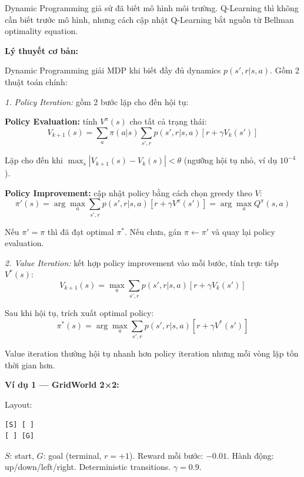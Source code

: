 \documentclass[12pt,a4paper]{article}
\begin{document}
Dynamic Programming giả sử đã biết mô hình môi trường. Q-Learning thì không cần biết trước mô hình, nhưng cách cập nhật Q-Learning bắt nguồn từ Bellman optimality equation.

\textbf{Lý thuyết cơ bản:}

Dynamic Programming giải MDP khi biết đầy đủ dynamics $p(s',r|s,a)$. Gồm 2 thuật toán chính:

\textit{1. Policy Iteration:} gồm 2 bước lặp cho đến hội tụ:

\textbf{Policy Evaluation:} tính $V^\pi(s)$ cho tất cả trạng thái:
\begin{equation}
V_{k+1}(s) = \sum_{a} \pi(a|s) \sum_{s',r} p(s',r|s,a) \left[ r + \gamma V_k(s') \right]
\end{equation}

Lặp cho đến khi $\max_s |V_{k+1}(s) - V_k(s)| < \theta$ (ngưỡng hội tụ nhỏ, ví dụ $10^{-4}$).

\textbf{Policy Improvement:} cập nhật policy bằng cách chọn greedy theo $V$:
\begin{equation}
\pi'(s) = \arg\max_a \sum_{s',r} p(s',r|s,a) \left[ r + \gamma V^\pi(s') \right] = \arg\max_a Q^\pi(s,a)
\end{equation}

Nếu $\pi' = \pi$ thì đã đạt optimal $\pi^*$. Nếu chưa, gán $\pi \leftarrow \pi'$ và quay lại policy evaluation.

\textit{2. Value Iteration:} kết hợp policy improvement vào mỗi bước, tính trực tiếp $V^*(s)$:
\begin{equation}
V_{k+1}(s) = \max_a \sum_{s',r} p(s',r|s,a) \left[ r + \gamma V_k(s') \right]
\end{equation}

Sau khi hội tụ, trích xuất optimal policy:
\begin{equation}
\pi^*(s) = \arg\max_a \sum_{s',r} p(s',r|s,a) \left[ r + \gamma V^*(s') \right]
\end{equation}

Value iteration thường hội tụ nhanh hơn policy iteration nhưng mỗi vòng lặp tốn thời gian hơn.

\textbf{Ví dụ 1 --- GridWorld 2×2:}

Layout:
\begin{verbatim}
[S] [ ]
[ ] [G]
\end{verbatim}

$S$: start, $G$: goal (terminal, $r=+1$). Reward mỗi bước: $-0.01$. Hành động: up/down/left/right. Deterministic transitions. $\gamma=0.9$.
\end{document}

